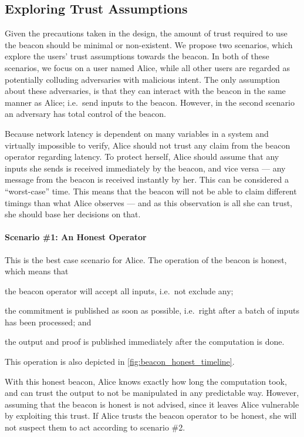 \subsection{Exploring Trust Assumptions}%
\label{sub:trusting_the_beacon}

Given the precautions taken in the design, the amount of trust required to use the beacon should be minimal or non-existent.
We propose two scenarios, which explore the users' trust assumptions towards the beacon.
In both of these scenarios, we focus on a user named Alice, while all other users are regarded as potentially colluding adversaries with malicious intent.
The only assumption about these adversaries, is that they can interact with the beacon in the same manner as Alice; i.e.\ send inputs to the beacon.
However, in the second scenario an adversary has total control of the beacon.

Because network latency is dependent on many variables in a system and virtually impossible to verify, Alice should not trust any claim from the beacon operator regarding latency.
To protect herself, Alice should assume that any inputs she sends is received immediately by the beacon, and vice versa --- any message from the beacon is received instantly by her. This can be considered a \enquote{worst-case} time.
This means that the beacon will not be able to claim different timings than what Alice observes --- and as this observation is all she can trust, she should base her decisions on that.

\paragraph{Scenario \#1: An Honest Operator}
This is the best case scenario for Alice.
The operation of the beacon is honest, which means that
\begin{eletterate*}
\item the beacon operator will accept all inputs, i.e.\ not exclude any;
\item the commitment is published as soon as possible, i.e.\ right after a batch of inputs has been processed; and
\item the output and proof is published immediately after the computation is done.
\end{eletterate*}
This operation is also depicted in \cref{fig:beacon_honest_timeline}.

With this honest beacon, Alice knows exactly how long the computation took, and can trust the output to not be manipulated in any predictable way.
However, assuming that the beacon is honest is not advised, since it leaves Alice vulnerable by exploiting this trust.
If Alice trusts the beacon operator to be honest, she will not suspect them to act according to scenario \#2.


